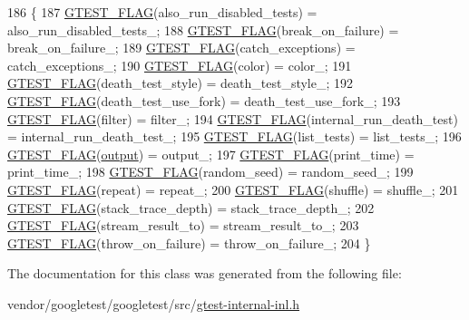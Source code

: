 \begin{DoxyCode}
186                     \{
187     \hyperlink{gtest-port_8h_a828f4e34a1c4b510da50ec1563e3562a}{GTEST\_FLAG}(also\_run\_disabled\_tests) = also\_run\_disabled\_tests\_;
188     \hyperlink{gtest-port_8h_a828f4e34a1c4b510da50ec1563e3562a}{GTEST\_FLAG}(break\_on\_failure) = break\_on\_failure\_;
189     \hyperlink{gtest-port_8h_a828f4e34a1c4b510da50ec1563e3562a}{GTEST\_FLAG}(catch\_exceptions) = catch\_exceptions\_;
190     \hyperlink{gtest-port_8h_a828f4e34a1c4b510da50ec1563e3562a}{GTEST\_FLAG}(color) = color\_;
191     \hyperlink{gtest-port_8h_a828f4e34a1c4b510da50ec1563e3562a}{GTEST\_FLAG}(death\_test\_style) = death\_test\_style\_;
192     \hyperlink{gtest-port_8h_a828f4e34a1c4b510da50ec1563e3562a}{GTEST\_FLAG}(death\_test\_use\_fork) = death\_test\_use\_fork\_;
193     \hyperlink{gtest-port_8h_a828f4e34a1c4b510da50ec1563e3562a}{GTEST\_FLAG}(filter) = filter\_;
194     \hyperlink{gtest-port_8h_a828f4e34a1c4b510da50ec1563e3562a}{GTEST\_FLAG}(internal\_run\_death\_test) = internal\_run\_death\_test\_;
195     \hyperlink{gtest-port_8h_a828f4e34a1c4b510da50ec1563e3562a}{GTEST\_FLAG}(list\_tests) = list\_tests\_;
196     \hyperlink{gtest-port_8h_a828f4e34a1c4b510da50ec1563e3562a}{GTEST\_FLAG}(\hyperlink{namespacegmock__output__test_a4277f8598ba3835393fe82e82d09375d}{output}) = output\_;
197     \hyperlink{gtest-port_8h_a828f4e34a1c4b510da50ec1563e3562a}{GTEST\_FLAG}(print\_time) = print\_time\_;
198     \hyperlink{gtest-port_8h_a828f4e34a1c4b510da50ec1563e3562a}{GTEST\_FLAG}(random\_seed) = random\_seed\_;
199     \hyperlink{gtest-port_8h_a828f4e34a1c4b510da50ec1563e3562a}{GTEST\_FLAG}(repeat) = repeat\_;
200     \hyperlink{gtest-port_8h_a828f4e34a1c4b510da50ec1563e3562a}{GTEST\_FLAG}(shuffle) = shuffle\_;
201     \hyperlink{gtest-port_8h_a828f4e34a1c4b510da50ec1563e3562a}{GTEST\_FLAG}(stack\_trace\_depth) = stack\_trace\_depth\_;
202     \hyperlink{gtest-port_8h_a828f4e34a1c4b510da50ec1563e3562a}{GTEST\_FLAG}(stream\_result\_to) = stream\_result\_to\_;
203     \hyperlink{gtest-port_8h_a828f4e34a1c4b510da50ec1563e3562a}{GTEST\_FLAG}(throw\_on\_failure) = throw\_on\_failure\_;
204   \}
\end{DoxyCode}


The documentation for this class was generated from the following file\+:\begin{DoxyCompactItemize}
\item 
vendor/googletest/googletest/src/\hyperlink{gtest-internal-inl_8h}{gtest-\/internal-\/inl.\+h}\end{DoxyCompactItemize}
